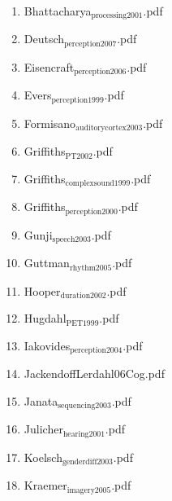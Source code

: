 \documentclass[11pt]{article}
\begin{document}
\begin{enumerate}
\begin{enumerate}
\item Bhattacharya$_{\text{processing2001}}$.pdf
\label{sec-1-1-1-1-30-29-4}

\item Deutsch$_{\text{perception2007}}$.pdf
\label{sec-1-1-1-1-30-29-5}

\item Eisencraft$_{\text{perception2006}}$.pdf
\label{sec-1-1-1-1-30-29-6}

\item Evers$_{\text{perception1999}}$.pdf
\label{sec-1-1-1-1-30-29-7}

\item Formisano$_{\text{auditorycortex2003}}$.pdf
\label{sec-1-1-1-1-30-29-8}

\item Griffiths$_{\text{PT2002}}$.pdf
\label{sec-1-1-1-1-30-29-9}

\item Griffiths$_{\text{complexsound1999}}$.pdf
\label{sec-1-1-1-1-30-29-10}

\item Griffiths$_{\text{perception2000}}$.pdf
\label{sec-1-1-1-1-30-29-11}

\item Gunji$_{\text{speech2003}}$.pdf
\label{sec-1-1-1-1-30-29-12}

\item Guttman$_{\text{rhythm2005}}$.pdf
\label{sec-1-1-1-1-30-29-13}

\item Hooper$_{\text{duration2002}}$.pdf
\label{sec-1-1-1-1-30-29-14}

\item Hugdahl$_{\text{PET1999}}$.pdf
\label{sec-1-1-1-1-30-29-15}

\item Iakovides$_{\text{perception2004}}$.pdf
\label{sec-1-1-1-1-30-29-16}

\item JackendoffLerdahl06Cog.pdf
\label{sec-1-1-1-1-30-29-17}

\item Janata$_{\text{sequencing2003}}$.pdf
\label{sec-1-1-1-1-30-29-18}

\item Julicher$_{\text{hearing2001}}$.pdf
\label{sec-1-1-1-1-30-29-19}

\item Koelsch$_{\text{genderdiff2003}}$.pdf
\label{sec-1-1-1-1-30-29-20}

\item Kraemer$_{\text{imagery2005}}$.pdf
\label{sec-1-1-1-1-30-29-21}


\end{enumerate}
\end{enumerate}
\end{document}
